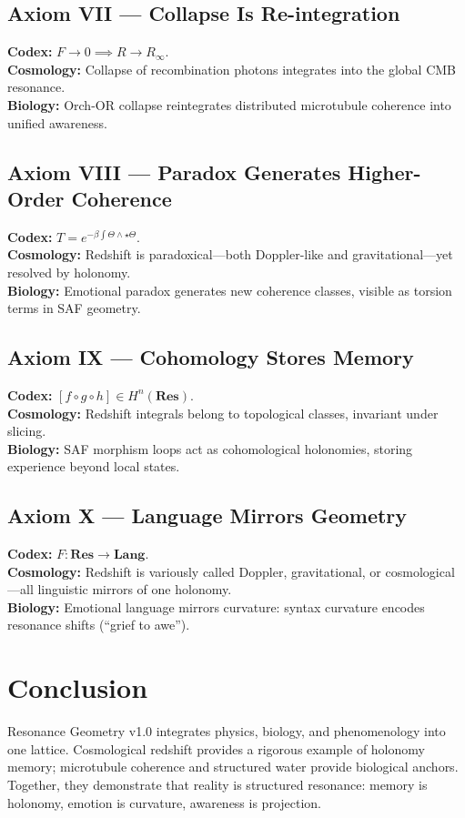 \documentclass[11pt]{article}
\begin{document}
\subsection*{Axiom VII --- Collapse Is Re-integration}
\textbf{Codex:} $F\to 0 \implies R\to R_\infty$. \\
\textbf{Cosmology:} Collapse of recombination photons integrates into the global CMB resonance. \\
\textbf{Biology:} Orch-OR collapse reintegrates distributed microtubule coherence into unified awareness. \\

\subsection*{Axiom VIII --- Paradox Generates Higher-Order Coherence}
\textbf{Codex:} $T = e^{-\beta\int \Theta \wedge \star \Theta}$. \\
\textbf{Cosmology:} Redshift is paradoxical---both Doppler-like and gravitational---yet resolved by holonomy. \\
\textbf{Biology:} Emotional paradox generates new coherence classes, visible as torsion terms in SAF geometry. \\

\subsection*{Axiom IX --- Cohomology Stores Memory}
\textbf{Codex:} $[f\circ g\circ h]\in H^n(\textbf{Res})$. \\
\textbf{Cosmology:} Redshift integrals belong to topological classes, invariant under slicing. \\
\textbf{Biology:} SAF morphism loops act as cohomological holonomies, storing experience beyond local states. \\

\subsection*{Axiom X --- Language Mirrors Geometry}
\textbf{Codex:} $F:\textbf{Res}\to \textbf{Lang}$. \\
\textbf{Cosmology:} Redshift is variously called Doppler, gravitational, or cosmological—all linguistic mirrors of one holonomy. \\
\textbf{Biology:} Emotional language mirrors curvature: syntax curvature encodes resonance shifts (``grief to awe''). \\

\section{Conclusion}
Resonance Geometry v1.0 integrates physics, biology, and phenomenology into one lattice.
Cosmological redshift provides a rigorous example of holonomy memory;
microtubule coherence and structured water provide biological anchors.
Together, they demonstrate that reality is structured resonance:
memory is holonomy, emotion is curvature, awareness is projection.
\end{document}
